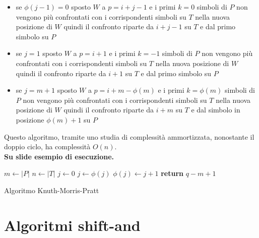 \documentclass[a4paper,12pt, oneside]{book}
\begin{document}
\begin{itemize}
  \item se $\phi(j-1)=0$ sposto $W$ a $p=i+j-1$ e i primi $k=0$ simboli di $P$
  non vengono più confrontati con i corrispondenti simboli su $T$ nella nuova
  posizione di $W$ quindi il confronto riparte da $i+j-1$ su $T$ e dal primo
  simbolo su $P$
  \item se $j=1$ sposto $W$ a $p=i+1$ e i primi $k=-1$ simboli di $P$
  non vengono più confrontati con i corrispondenti simboli su $T$ nella nuova
  posizione di $W$ quindi il confronto riparte da $i+1$ su $T$ e dal primo
  simbolo su $P$
  \item se $j=m+1$ sposto $W$ a $p=i+m-\phi(m)$ e i primi $k=\phi(m)$ simboli di
  $P$ 
  non vengono più confrontati con i corrispondenti simboli su $T$ nella nuova
  posizione di $W$ quindi il confronto riparte da $i+m$ su $T$ e dal 
  simbolo in posizione $\phi(m)+1$ su $P$
\end{itemize}

Questo algoritmo, tramite uno studia di complessità ammortizzata, nonostante il
doppio ciclo, ha complessità $O(n)$.\\
\textbf{Su slide esempio di esecuzione.}
\begin{algorithm}
  \begin{algorithmic}
    \State $m\gets |P|$
    \State $n\gets |T|$
    \State $j\gets 0$
    \State $j \gets \phi(j)$
    \EndWhile
    \State $\phi(j)\gets j+1$
    \State \textbf{return} $q-m+1$
    \EndIf
    \EndFor   
    \EndFunction
  \end{algorithmic}
  \caption{Algoritmo Knuth-Morris-Pratt}
\end{algorithm}
\section{Algoritmi shift-and}
\end{document}
